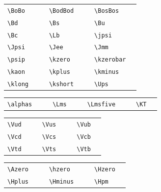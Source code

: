 \documentclass[11pt,a4paper]{atlasnote}
\begin{document}
\medskip

\begin{tabular}{llcllcll}
  \verb+\BoBo+ & \BoBo{} & \hspace{1cm} &
  \verb+\BodBod+ & \BodBod{} & \hspace{1cm} &
  \verb+\BosBos+ & \BosBos{} \\
  \verb+\Bd+ & \Bd{} & &
  \verb+\Bs+ & \Bs{} & &
  \verb+\Bu+ & \Bu{} \\
  \verb+\Bc+ & \Bc{} & &
  \verb+\Lb+ & \Lb{} & &
  \verb+\jpsi+ & \jpsi{} \\
  \verb+\Jpsi+ & \Jpsi{} & &
  \verb+\Jee+ & \Jee{} & &
  \verb+\Jmm+ & \Jmm{} \\
  \verb+\psip+ & \psip{} & &
  \verb+\kzero+ & \kzero{} & &
  \verb+\kzerobar+ & \kzerobar{} \\
  \verb+\kaon+ & \kaon{} & &
  \verb+\kplus+ & \kplus{} & &
  \verb+\kminus+ & \kminus{} \\
  \verb+\klong+ & \klong{} & &
  \verb+\kshort+ & \kshort{} & &
  \verb+\Ups+ & \Ups{} \\
\end{tabular}

\medskip

\begin{tabular}{llcllcllcll}
  \verb+\alphas+ & \alphas{} & \hspace{1cm} &
  \verb+\Lms+ & \Lms{} & \hspace{1cm} &
  \verb+\Lmsfive+ & \Lmsfive{} & \hspace{1cm} &
  \verb+\KT+ & \KT{} \\
\end{tabular}

\medskip

\begin{tabular}{llcllcll}
  \verb+\Vud+ & \Vud{} & \hspace{1cm} &
  \verb+\Vus+ & \Vus{} & \hspace{1cm} &
  \verb+\Vub+ & \Vub{} \\
  \verb+\Vcd+ & \Vcd{} &  &
  \verb+\Vcs+ & \Vcs{} &  &
  \verb+\Vcb+ & \Vcb{} \\
  \verb+\Vtd+ & \Vtd{} & &
  \verb+\Vts+ & \Vts{} & & 
  \verb+\Vtb+ & \Vtb{} \\
\end{tabular}

\medskip

\begin{tabular}{llcllcll}
  \verb+\Azero+ & \Azero{} & \hspace{1cm} &
  \verb+\hzero+ & \hzero{} & \hspace{1cm} &
  \verb+\Hzero+ & \Hzero{} \\
  \verb+\Hplus+ & \Hplus{} & &
  \verb+\Hminus+ & \Hminus{} & &
  \verb+\Hpm+ & \Hpm{} \\
\end{tabular}
\end{document}
